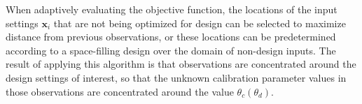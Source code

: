 \documentclass[12pt]{article}
\begin{document}
\begin{figure}[h]
\begin{tabular}{|p{.025\linewidth}p{.85\linewidth}|}
		\hline
	\end{tabular}
\end{figure}
%
When adaptively evaluating the objective function, the locations of the input settings $\mathbf x_i$ that are not being optimized for design can be selected to maximize distance from previous observations, or these locations can be predetermined according to a space-filling design over the domain of non-design inputs.
%
The result of applying this algorithm is that observations are concentrated around the design settings of interest, so that the unknown calibration parameter values in those observations are concentrated around the value $\theta_c(\theta_d)$.
%
\end{document}
